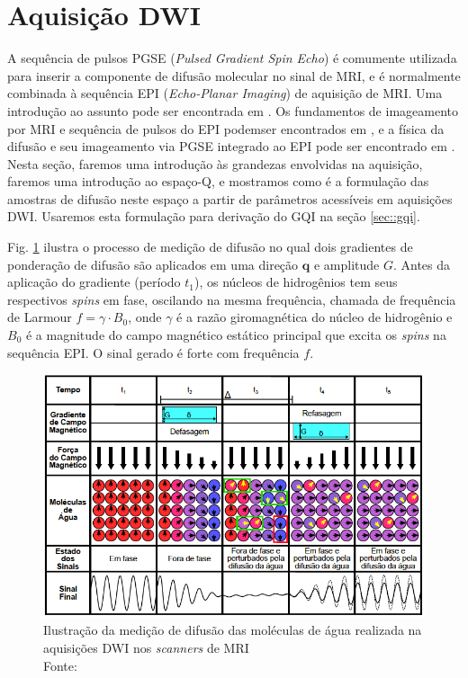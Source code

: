 \documentclass[
    12pt,                %
    oneside,            %
    a4paper,            %
    english,            %
    french,                %
    spanish,            %
    brazil                %
    ]{abntex2}
\begin{document}
\section{Aquisição DWI}
\label{sec::aquisicao_dwi}
A sequência de pulsos PGSE (\textit{Pulsed Gradient Spin Echo}) é comumente utilizada para inserir a componente de difusão molecular no sinal de MRI, e é normalmente combinada à sequência  EPI (\textit{Echo-Planar Imaging}) de aquisição de MRI. Uma introdução ao assunto pode ser encontrada em . Os fundamentos de imageamento por MRI e sequência de pulsos do EPI podemser encontrados em , e a física da difusão e seu imageamento via PGSE integrado ao EPI pode ser encontrado em . Nesta seção, faremos uma introdução às grandezas envolvidas na aquisição, faremos uma introdução ao espaço-Q, e mostramos como é a formulação das amostras de difusão neste espaço a partir de parâmetros acessíveis em aquisições DWI. Usaremos esta formulação para derivação do GQI na seção \ref{sec::gqi}.

Fig. \ref{fig::pgse_ilustrado} ilustra o processo de medição de difusão no qual dois gradientes de ponderação de difusão são aplicados em uma direção $\mathbf{\hat{q}}$ e amplitude $G$. Antes da aplicação do gradiente (período $t_1$), os núcleos de hidrogênios tem seus respectivos \textit{spins} em fase, oscilando na mesma frequência, chamada de frequência de Larmour $f = \gamma \cdot B_0$, onde $\gamma$ é a razão giromagnética do núcleo de hidrogênio e $B_0$ é a magnitude do campo magnético estático principal que excita os \textit{spins} na sequência EPI. O sinal gerado é forte com frequência $f$.

\begin{figure}[ht]

    \centering
    \includegraphics[width=.8\linewidth, angle=0]{figs/HARDI/pgse2.png}
    \caption{Ilustração da medição de difusão das moléculas de água realizada na aquisições DWI nos \textit{scanners} de MRI \\
    Fonte: \cite{voltoline2016}
    }
    \label{fig::pgse_ilustrado}
   \hspace{1pt}
\end{figure}
\end{document}
